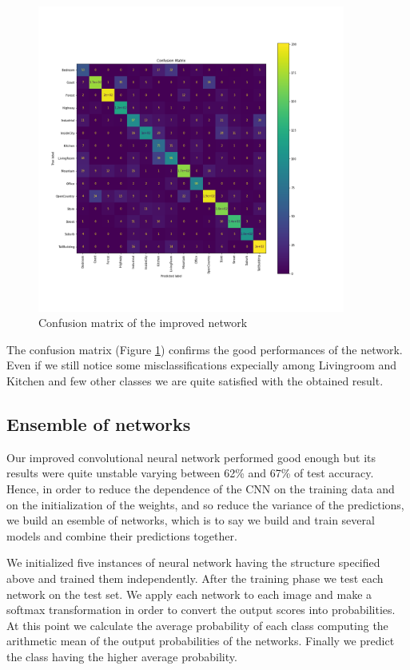 \documentclass[12pt, a4paper]{report}
\begin{document}
\begin{figure}[h!]
	\centering
	\includegraphics[width=0.9\textwidth]{img/final_cmatrix}
	\caption{Confusion matrix of the improved network}
	\label{fig:improvedcmatrix}
\end{figure}

The confusion matrix (Figure \ref{fig:improvedcmatrix}) confirms the good performances of the network. Even if we still notice some misclassifications expecially among Livingroom and Kitchen and few other classes we are quite satisfied with the obtained result.

\subsection*{Ensemble of networks}

Our improved convolutional neural network performed good enough but its results were quite unstable varying between 62\% and 67\% of test accuracy. Hence, in order to reduce the dependence of the CNN on the training data and on the initialization of the weights, and so reduce the variance of the predictions, we build an esemble of networks, which is to say we build and train several models and combine their predictions together.

We initialized five instances of neural network having the structure specified above and trained them independently. After the training phase we test each network on the test set. We apply each network to each image and make a softmax transformation in order to convert the output scores into probabilities. At this point we calculate the average probability of each class computing the arithmetic mean of the output probabilities of the networks. Finally we predict the class having the higher average probability.
\end{document}
